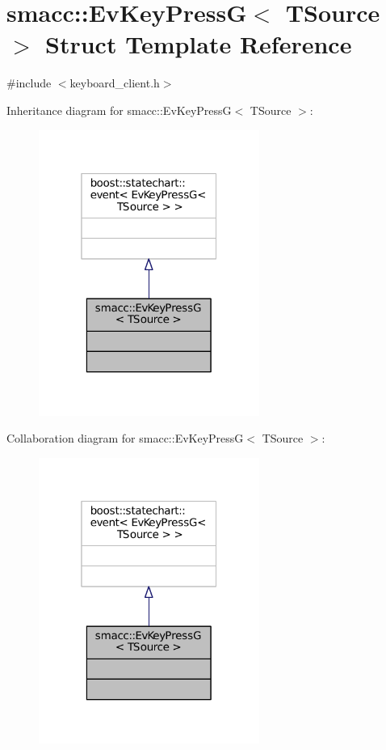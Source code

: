 \hypertarget{structsmacc_1_1EvKeyPressG}{}\section{smacc\+:\+:Ev\+Key\+PressG$<$ T\+Source $>$ Struct Template Reference}
\label{structsmacc_1_1EvKeyPressG}


{\ttfamily \#include $<$keyboard\+\_\+client.\+h$>$}



Inheritance diagram for smacc\+:\+:Ev\+Key\+PressG$<$ T\+Source $>$\+:
\nopagebreak
\begin{figure}[H]
\begin{center}
\leavevmode
\includegraphics[width=205pt]{structsmacc_1_1EvKeyPressG__inherit__graph}
\end{center}
\end{figure}


Collaboration diagram for smacc\+:\+:Ev\+Key\+PressG$<$ T\+Source $>$\+:
\nopagebreak
\begin{figure}[H]
\begin{center}
\leavevmode
\includegraphics[width=205pt]{structsmacc_1_1EvKeyPressG__coll__graph}
\end{center}
\end{figure}


